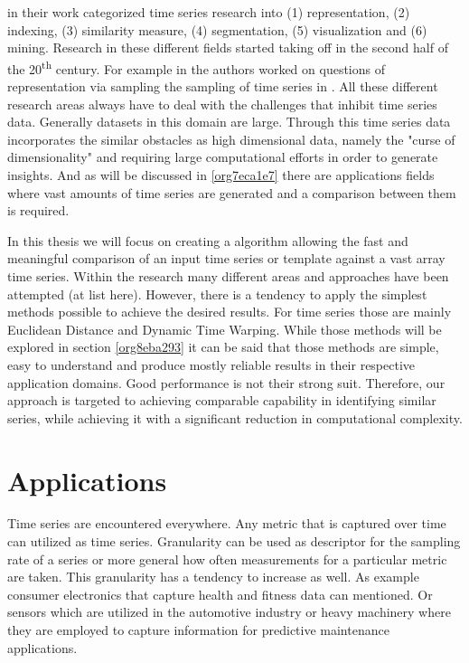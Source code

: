 \documentclass[phd,black, hidelinks]{PrincetonThesis}
\begin{document}
\citeauthor{Fu_2011} in their work \cite{Fu_2011} categorized time series research into (1) representation, (2) indexing, (3) similarity measure, (4) segmentation, (5) visualization and (6) mining. Research in these different fields started taking off in the second half of the 20\textsuperscript{th} century. For example in \cite{_str_m_1969} the authors worked on questions of representation via sampling the sampling of time series in \citeyear{_str_m_1969}. All these different research areas always have to deal with the challenges that inhibit time series data. Generally datasets in this domain are large. Through this time series data incorporates the similar obstacles as high dimensional data, namely the "curse of dimensionality" \cite{Tang_2019} and requiring large computational efforts in order to generate insights. And as will be discussed in \ref{org7eca1e7} there are applications fields where vast amounts of time series are generated and a comparison between them is required.

In this thesis we will focus on creating a algorithm allowing the fast and meaningful comparison of an input time series or template against a vast array time series. Within the research many different areas and approaches have been attempted (at list here). However, there is a tendency to apply the simplest methods possible to achieve the desired results. For time series those are mainly Euclidean Distance and Dynamic Time Warping. While those methods will be explored in section \ref{org8eba293} it can be said that those methods are simple, easy to understand and produce mostly reliable results in their respective application domains. Good performance is not their strong suit. Therefore, our approach is targeted to achieving comparable capability in identifying similar series, while achieving it with a significant reduction in computational complexity.

\section{Applications}
\label{sec:org7c3cf06}
\label{org7eca1e7}
Time series are encountered everywhere. Any metric that is captured over time can utilized as time series. Granularity can be used as descriptor for the sampling rate of a series or more general how often measurements for a particular metric are taken. This granularity has a tendency to increase as well. As example consumer electronics that capture health and fitness data can mentioned. Or sensors which are utilized in the automotive industry or heavy machinery where they are employed to capture information for predictive maintenance applications.\\
\end{document}
